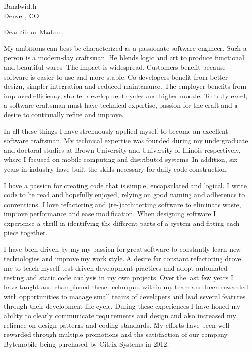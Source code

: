 \documentclass{letter}
\date{}
\begin{document}
\address{Nathanael Thompson\\1102 Lincolnshire Drive\\Champaign, IL 61821\\nat@alumni.brown.edu\\(469)
230-7125 (mobile)}
\signature{Nathanael Thompson}
\begin{letter}{Bandwidth\\Denver, CO}

\opening{Dear Sir or Madam,}
My ambitions can best be characterized as a passionate software
engineer.  Such a person is a modern-day craftsman.  He blends logic
and art to produce functional and beautiful wares.  The impact is
widespread.  Customers benefit because software is easier to use
and more stable.  Co-developers benefit from better design, simpler
integration and reduced maintenance.  The employer benefits from
improved efficiency, shorter development cycles and higher morale.
To truly excel, a software craftsman must have technical expertise,
passion for the craft and a desire to continually refine and improve.

In all these things I have strenuously applied myself to become an
excellent software craftsman.  My technical expertise was founded
during my undergraduate and doctoral studies at Brown University
and University of Illinois respectively, where I focused on mobile
computing and distributed systems.  In addition, six years in
industry have built the skills necessary for daily code construction.

I have a passion for creating code that is simple, encapsulated and
logical.  I write code to be read and hopefully enjoyed, relying
on good naming and adherence to conventions.  I love refactoring
and (re-)architecting software to eliminate waste, improve performance
and ease modification.  When designing software I experience a
thrill in identifying the different parts of a system and fitting
each piece together.

I have been driven by my my passion for great software to constantly
learn new technologies and improve my work style.  A desire for
constant refactoring drove me to teach myself test-driven development
practices and adopt automated testing and static code analysis in
my own projects.  Over the last few years I have taught and championed
these techniques within my team and been rewarded with opportunities
to manage small teams of developers and lead several features through
their development life-cycle.  During these experiences I have honed
my ability to clearly communicate requirements and design and
also increased my reliance on design patterns and coding standards.
My efforts have been well-rewarded through multiple promotions and
the satisfaction of our company Bytemobile being purchased by Citrix
Systems in 2012.


\end{letter}
\end{document}
